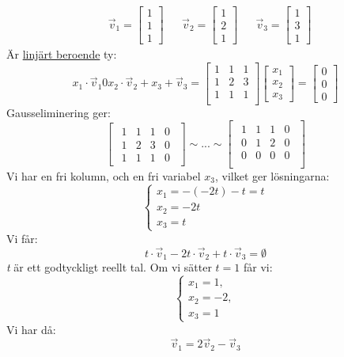 \begin{Ex}
	\begin{align*}
	&\vec{v}_1 = \begin{bmatrix} 1\\1\\1 \end{bmatrix}
	&&\vec{v}_2 = \begin{bmatrix} 1\\2\\1 \end{bmatrix}
	&&\vec{v}_3 = \begin{bmatrix} 1\\3\\1 \end{bmatrix}
	\end{align*}
	Är \underline{linjärt beroende} ty:
	\[
	x_1 \cdot \vec{v}_1 0 x_2 \cdot \vec{v}_2 + x_3 + \vec{v}_3 =
	\begin{bmatrix}
		1 & 1 & 1\\
		1 & 2 & 3\\
		1 & 1 & 1\\
	\end{bmatrix}
	\begin{bmatrix} x_1\\x_2\\x_3 \end{bmatrix} = \begin{bmatrix} 0\\0\\0 \end{bmatrix}
	\]
	Gausseliminering ger:
	\[
	\begin{bmatrix}
		\begin{array}{ccc|c}
			1 & 1 & 1 & 0\\
			1 & 2 & 3 & 0\\
			1 & 1 & 1 & 0
		\end{array}
	\end{bmatrix} \sim ... \sim
	\begin{bmatrix}
		\begin{array}{ccc|c}
			1 & 1 & 1 & 0\\
			0 & 1 & 2 & 0\\
			0 & 0 & 0 & 0\\
		\end{array}
	\end{bmatrix}
	\]
	Vi har en fri kolumn, och en fri variabel $x_3$, vilket ger lösningarna:
	\[
	\begin{cases}
		x_1 = -(-2t) - t = t\\
		x_2 = -2t\\
		x_3 = t
	\end{cases}
	\]
	Vi får:
	\[
	t \cdot \vec{v}_1 - 2t \cdot \vec{v}_2 + t \cdot \vec{v}_3 = \emptyset
	\]
	\textit{t} är ett godtyckligt reellt tal. Om vi sätter $t = 1$ får vi:
	\[
	\begin{cases}
		x_1 = 1, \\ 
		x_2 = -2, \\
		x_3 = 1
	\end{cases}
	\]
	Vi har då:
	\[
	\vec{v}_1 = 2 \vec{v}_2 - \vec{v}_3
	\]
\end{Ex}
